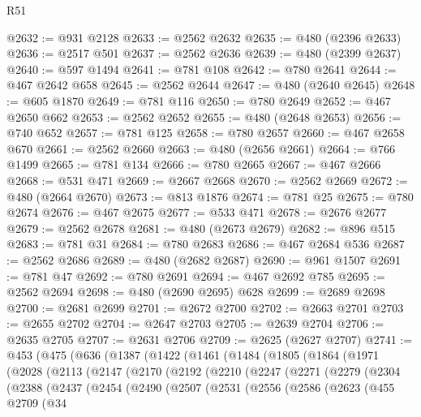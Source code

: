 \begin{lexlean}{R51}
\begin{coremodule}
@2632 := @931 @2128
@2633 := @2562 @2632
@2635 := @480 (@2396 @2633)
@2636 := @2517 @501
@2637 := @2562 @2636
@2639 := @480 (@2399 @2637)
@2640 := @597 @1494
@2641 := @781 @108
@2642 := @780 @2641
@2644 := @467 @2642 @658
@2645 := @2562 @2644
@2647 := @480 (@2640 @2645)
@2648 := @605 @1870
@2649 := @781 @116
@2650 := @780 @2649
@2652 := @467 @2650 @662
@2653 := @2562 @2652
@2655 := @480 (@2648 @2653)
@2656 := @740 @652
@2657 := @781 @125
@2658 := @780 @2657
@2660 := @467 @2658 @670
@2661 := @2562 @2660
@2663 := @480 (@2656 @2661)
@2664 := @766 @1499
@2665 := @781 @134
@2666 := @780 @2665
@2667 := @467 @2666
@2668 := @531 @471
@2669 := @2667 @2668
@2670 := @2562 @2669
@2672 := @480 (@2664 @2670)
@2673 := @813 @1876
@2674 := @781 @25
@2675 := @780 @2674
@2676 := @467 @2675
@2677 := @533 @471
@2678 := @2676 @2677
@2679 := @2562 @2678
@2681 := @480 (@2673 @2679)
@2682 := @896 @515
@2683 := @781 @31
@2684 := @780 @2683
@2686 := @467 @2684 @536
@2687 := @2562 @2686
@2689 := @480 (@2682 @2687)
@2690 := @961 @1507
@2691 := @781 @47
@2692 := @780 @2691
@2694 := @467 @2692 @785
@2695 := @2562 @2694
@2698 := @480 (@2690 @2695) @628
@2699 := @2689 @2698
@2700 := @2681 @2699
@2701 := @2672 @2700
@2702 := @2663 @2701
@2703 := @2655 @2702
@2704 := @2647 @2703
@2705 := @2639 @2704
@2706 := @2635 @2705
@2707 := @2631 @2706
@2709 := @2625 (@2627 @2707)
@2741 := @453
    (@475
      (@636
        (@1387
          (@1422
            (@1461
              (@1484
                (@1805
                  (@1864
                    (@1971
                      (@2028
                        (@2113
                          (@2147
                            (@2170
                              (@2192
                                (@2210
                                  (@2247
                                    (@2271
                                      (@2279
                                        (@2304
                                          (@2388
                                            (@2437
                                              (@2454
                                                (@2490
                                                  (@2507
                                                    (@2531
                                                      (@2556
                                                        (@2586
                                                          (@2623
                                                            (@455
                                                              @2709
                                                              (@34

\end{coremodule}
\end{lexlean}

